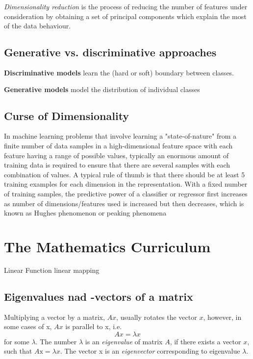 \documentclass[11pt]{article}
\theoremstyle{plain}
\theoremstyle{definition}
\begin{document}
\textit{Dimensionality reduction} is the process of reducing the number of features under consideration by obtaining a set of principal components which explain the most of the data behaviour.

\subsection{Generative vs. discriminative approaches}
\textbf{Discriminative models}  learn the (hard or soft) boundary between classes.

\noindent\textbf{Generative models}  model the distribution of individual classes

\subsection{Curse of Dimensionality}
In machine learning problems that involve learning a "state-of-nature" from a finite number of data samples in a high-dimensional feature space with each feature having a range of possible values, typically an enormous amount of training data is required to ensure that there are several samples with each combination of values. A typical rule of thumb is that there should be at least 5 training examples for each dimension in the representation. With a fixed number of training samples, the predictive power of a classifier or regressor first increases as number of dimensions/features used is increased but then decreases, which is known as Hughes phenomenon or peaking phenomena


\section{The Mathematics Curriculum}
Linear Function linear mapping

\subsection{Eigenvalues nad -vectors of a matrix}
Multiplying a vector by a matrix, $Ax$, usually rotates the vector $x$, however, in some cases of x, $Ax$ is parallel to x, i.e.
\begin{equation}
Ax = \lambda x
\end{equation}
for some $\lambda$. The number $\lambda$ is an \textit{eigenvalue} of matrix $A$, if there exists a vector $x$, such that $A\text{x} = \lambda x$. The vector x is an \textit{eigenvector} corresponding to eigenvalue $\lambda$.
\end{document}
